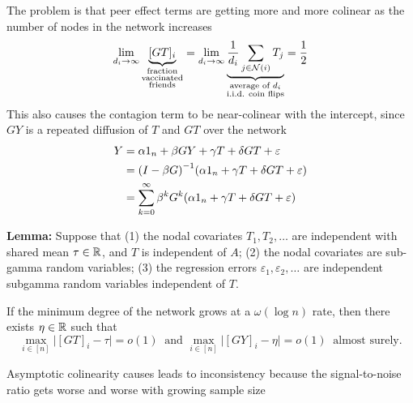 \documentclass[final]{beamer}
\newlength{\colwidth}
\begin{document}
\begin{frame}[t]
\begin{columns}[t]
\begin{column}{\colwidth}
\begin{block}{The problem is that peer effect terms are getting more and more colinear as the number of nodes in the network increases}
                \begin{equation} \label{eq:avg}
                    \lim_{d_i \to \infty}
                    \underbrace{[GT]_i}_{\substack{\text{fraction} \\ \text{vaccinated} \\ \text{friends}}}
                    =
                    \lim_{d_i \to \infty}
                    \underbrace{
                        \frac{1}{d_i} \sum_{j \in \mathcal N(i)} T_j
                    }_{\substack{\text{average of $d_i$}           \\ \text{i.i.d. coin flips}}}
                    = \frac 12
                \end{equation}
                This also causes the contagion term to be near-colinear with the intercept, since $GY$ is a repeated diffusion of $T$ and $GT$ over the network
                \begin{align*}
                    Y & = \alpha 1_n + \beta G Y + \gamma T + \delta G T + \varepsilon                            \\
                      & = \paren*{I - \beta G}^{-1} \paren*{\alpha 1_n + \gamma T + \delta G T + \varepsilon}     \\
                      & = \sum_{k=0}^\infty \beta^k G^k \paren*{\alpha 1_n + \gamma T + \delta G T + \varepsilon}
                \end{align*}

                \textbf{Lemma:} Suppose that (1) the nodal covariates $T_1, T_2, \dots$ are independent with shared mean $\tau \in \mathbb{R}$, and $T$ is independent of $A$; (2) the nodal covariates are sub-gamma random variables; (3) the regression errors $\varepsilon_1, \varepsilon_2, \dots$ are independent subgamma random variables independent of $T$.

                If the minimum degree of the network grows at a $\omega(\log n)$ rate, then there exists $\eta \in \mathbb{R}$ such that
                \begin{equation*}
                    \max_{i \in [n]} \Big| [GT]_i - \tau \Big|
                    = o(1) ~ \text{ and }
                    \max_{i \in [n]} \Big| [GY]_i - \eta \Big| = o(1)~ \text{ almost surely.}
                \end{equation*}
            \end{block}

            \begin{block}{Asymptotic colinearity causes leads to inconsistency because the signal-to-noise ratio gets worse and worse with growing sample size}


\end{block}
\end{column}
\end{columns}
\end{frame}
\end{document}
